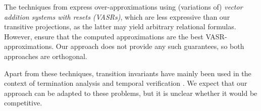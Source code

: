 The techniques from \cite{silverman19,kincaid24} express over-ap\-prox\-i\-ma\-tions using (variations of) \emph{vector addition systems with resets (VASRs)}, which are less expressive than our transitive projections, as the latter may yield arbitrary relational formulas.
%
However, \cite{silverman19,kincaid24} ensure that the computed ap\-prox\-i\-ma\-tions are the best VASR-ap\-prox\-i\-ma\-tions.
%
Our approach does not provide any such guarantees, so both approaches are orthogonal.

Apart from these techniques, transition invariants have mainly been used in the context of termination analysis and temporal verification \cite{tsitovich11,compositional_transition_invariants,heizmann10,podelski11,zuleger18}.
%
We expect that our approach can be adapted to these problems, but it is unclear whether it would be competitive.
